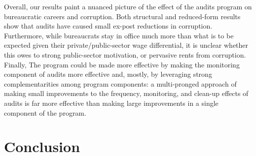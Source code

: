 {Overall, our results paint a nuanced picture of the effect of the audits program on bureaucratic careers and corruption. Both structural and reduced-form results show that audits have caused small ex-post reductions in corruption. Furthermore, while bureaucrats stay in office much more than what is to be expected given their private/public-sector wage differential, it is unclear whether this owes to strong public-sector motivation, or pervasive rents from corruption. Finally, The program could be made more effective by making the monitoring component of audits more effective and, mostly, by leveraging strong complementarities among program components: a multi-pronged approach of making small improvements to the frequency, monitoring, and clean-up effects of audits is far more effective than making large improvements in a single component of the program. 

\section{Conclusion}
\label{sec:conclusion}




}
